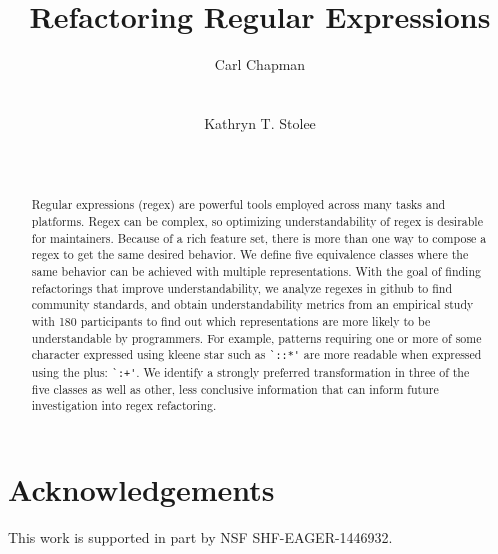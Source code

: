 \documentclass{sig-alternate-05-2015}
\begin{document}
%
\title{Refactoring Regular Expressions}


\author{
\alignauthor
Carl Chapman\\
       \\
       \\
\alignauthor
Kathryn T. Stolee\\
       \\
       \\
\alignauthor
}


\maketitle


\begin{abstract}
Regular expressions (regex) are powerful tools employed across many tasks and platforms.
Regex can be complex, so optimizing understandability of regex is desirable for maintainers.
Because of a rich feature set, there is more than one way to compose a regex to get the same desired behavior.
We define five equivalence classes where the same behavior can be achieved with multiple representations.
With the goal of finding refactorings that improve understandability, we analyze regexes in github to find community standards, and obtain understandability metrics from an empirical study with 180 participants to find out which representations are more likely to be understandable by programmers.
For example, patterns requiring one or more of some character expressed using kleene star such as \verb!`::*'! are more readable when expressed using the plus: \verb!`:+'!.  We identify a strongly preferred transformation in three of the five classes as well as other, less conclusive information that can inform future investigation into regex refactoring.

\end{abstract}




















\balance

\section*{Acknowledgements}
This work is supported in part by  NSF SHF-EAGER-1446932.




\end{document}
